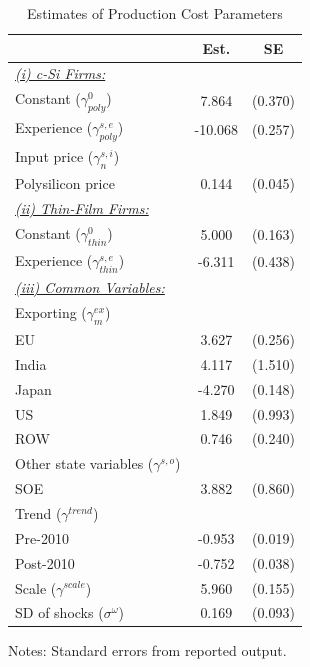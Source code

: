\documentclass[12pt, letter]{article}
\begin{document}
\begin{table}[!h]
\centering
\caption{Estimates of Production Cost Parameters}
\label{tab:est_dyn_para_1}
\begin{threeparttable}
\begin{tabularx}{0.75\textwidth}{Xcc}
\toprule
 & Est. & SE \\
\midrule
\underline{\textit{(i) c-Si Firms:}} & \\
\quad Constant ($\gamma^{0}_{poly}$) & 7.864 & (0.370) \\
\quad Experience ($\gamma^{s,e}_{poly}$) & -10.068 & (0.257) \\
\quad Input price ($\gamma^{s,i}_{n}$) & \\
\quad\quad Polysilicon price & 0.144 & (0.045) \\
\underline{\textit{(ii) Thin-Film Firms:}} \\
\quad Constant ($\gamma^{0}_{thin}$) & 5.000 & (0.163) \\
\quad Experience ($\gamma^{s,e}_{thin}$) & -6.311 & (0.438) \\
\underline{\textit{(iii) Common Variables:}} &  \\
\quad Exporting ($\gamma_m^{ex}$) & \\
\quad\quad EU & 3.627 & (0.256) \\
\quad\quad India & 4.117 & (1.510) \\
\quad\quad Japan & -4.270 & (0.148) \\
\quad\quad US & 1.849 & (0.993) \\
\quad\quad ROW & 0.746 & (0.240) \\
\quad Other state variables ($\gamma^{s,o}$) &  \\
\quad\quad SOE & 3.882 & (0.860) \\
\quad Trend ($\gamma^{trend}$) & \\
\quad\quad Pre-2010 & -0.953 & (0.019) \\
\quad\quad Post-2010 & -0.752 & (0.038) \\
\quad Scale ($\gamma^{scale}$) & 5.960 & (0.155) \\
\quad SD of shocks ($\sigma^{\omega}$) & 0.169 & (0.093) \\
\bottomrule
\end{tabularx}
\begin{tablenotes}
  \item Notes: Standard errors from reported output.
\end{tablenotes}
\end{threeparttable}
\end{table}
\end{document}
